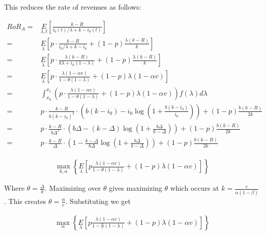  This reduces the rate of revenues as follows:

\begin{align*}
RoR_A =& \underset{\lambda, t}E\left[\frac{k-R}{i_0(t)/\lambda + k - i_0(t)}\right]\\
                                       =& \underset{\lambda}E\left[p\cdot\frac{k-R}{i_0/\lambda + k - i_0} + (1-p)\frac{\lambda(k-R)}{k}\right]\\
                                       =& \underset{\lambda}E\left[p\cdot\frac{\lambda(k-R)}{k\lambda + i_0(1-\lambda)} + (1-p)\frac{\lambda(k-R)}{k}\right]\\
                                       =& \underset{\lambda}E\left[p\cdot\frac{\lambda(1-\alpha v)}{1-\theta(1-\lambda)} + (1-p)\lambda (1-\alpha v)\right]\\
                                       =& \int_{x_0}^{x_1} \left(p\cdot\frac{\lambda(1-\alpha v)}{1-\theta(1-\lambda)} + (1-p)\lambda (1-\alpha v)\right) f(\lambda) d\lambda\\
                                       =& p\cdot\frac{k-R}{b(k-i_0)^2}\cdot\left(b(k-i_0) - i_0 \log\left(1 + \frac{b(k-i_0)}{i_0}\right)\right) + (1-p)\frac{b(k-R)}{2k}\\
                                       =& p\cdot\frac{k-R}{b\Delta^2}\cdot\left(b\Delta - (k-\Delta)\log\left(1+\frac{b\Delta}{k-\Delta}\right)\right) + (1-p)\frac{b(k-R)}{2k}\\
                                       =& p\cdot\frac{k-R}{\Delta}\cdot\left(1 - \frac{k-\Delta}{b\Delta}\log\left(1+\frac{b\Delta}{k-\Delta}\right)\right) + (1-p)\frac{b(k-R)}{2k}
\end{align*}

{\arpit
\begin{align*}
\max_{k,\alpha} \left\{\underset{\lambda}E\left[p\frac{\lambda(1-\alpha v)}{1-\theta(1-\lambda)} + (1-p)\lambda (1-\alpha v)\right]\right\}
\end{align*}

Where $\theta = \frac{\Delta}{k}$. Maximizing over $\theta$ gives maximizing $\theta$ which occurs at $k = \frac{e}{\alpha (1-\beta)}$.
This creates $\theta = \frac{\alpha}{e}$. Substituting we get

\begin{align*}
\max_{\alpha} \left\{\underset{\lambda}E\left[p\frac{\lambda(1-\alpha v)}{1-\frac{\alpha}{e}(1-\lambda)} + (1-p)\lambda (1-\alpha v)\right]\right\}
\end{align*}
}

